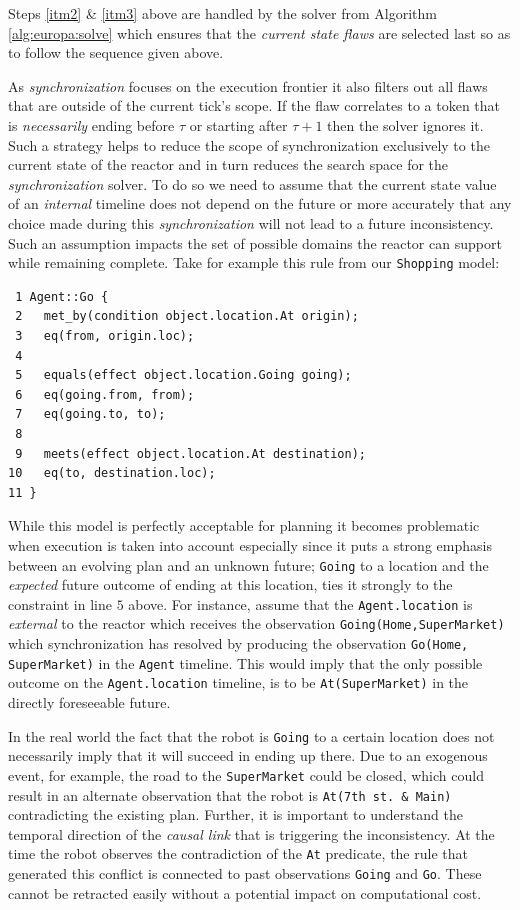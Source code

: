 Steps \ref{itm2} \& \ref{itm3} above are handled by the \eu solver
from Algorithm \ref{alg:europa:solve} which ensures that the {\em
  current state flaws} are selected last so as to follow the sequence
given above.

As {\em synchronization} focuses on the execution frontier it also
filters out all flaws that are outside of the current tick's scope.
If the flaw correlates to a token that is {\em necessarily} ending
before $\tau$ or starting after $\tau+1$ then the solver ignores
it. Such a strategy helps to reduce the scope of synchronization
exclusively to the current state of the reactor and in turn reduces
the search space for the {\em synchronization} solver.  To do so we
need to assume that the current state value of an {\em internal}
timeline does not depend on the future or more accurately that any
choice made during this {\em synchronization} will not lead to a
future inconsistency.  Such an assumption impacts the set of possible
domains the reactor can support while remaining
 complete. Take for example this rule from
our \texttt{Shopping} model:

\begin{verbatim}
 1 Agent::Go {
 2   met_by(condition object.location.At origin);
 3   eq(from, origin.loc);
 4
 5   equals(effect object.location.Going going);
 6   eq(going.from, from);
 7   eq(going.to, to);
 8   
 9   meets(effect object.location.At destination);
10   eq(to, destination.loc);
11 }
\end{verbatim}

While this model is perfectly acceptable for planning it becomes
problematic when execution is taken into account especially since it
puts a strong emphasis between an evolving plan and an unknown future;
\texttt{Going} to a location and the {\em expected} future outcome of
ending at this location, ties it strongly to the constraint in line
$5$ above. For instance, assume that the \texttt{Agent.location} is
{\em external} to the reactor which receives the observation
\texttt{Going(Home,SuperMarket)} which synchronization has resolved by
producing the observation \texttt{Go(Home, SuperMarket)} in the
\texttt{Agent} timeline. This would imply that the only possible
outcome on the \texttt{Agent.location} timeline, is to be
\texttt{At(SuperMarket)} in the directly foreseeable future. 

In the real world the fact that the robot is \texttt{Going} to a
certain location does not necessarily imply that it will succeed in
ending up there. Due to an exogenous event, for example, the road to
the \texttt{SuperMarket} could be closed, which could result in an
alternate observation that the robot is \texttt{At(7th st. \& Main)}
contradicting the existing plan. Further, it is important to
understand the temporal direction of the \emph{causal link} that is
triggering the inconsistency. At the time the robot observes the
contradiction of the \texttt{At} predicate, the rule that generated
this conflict is connected to past observations \texttt{Going} and
\texttt{Go}. These cannot be retracted easily without a potential
impact on computational cost.

